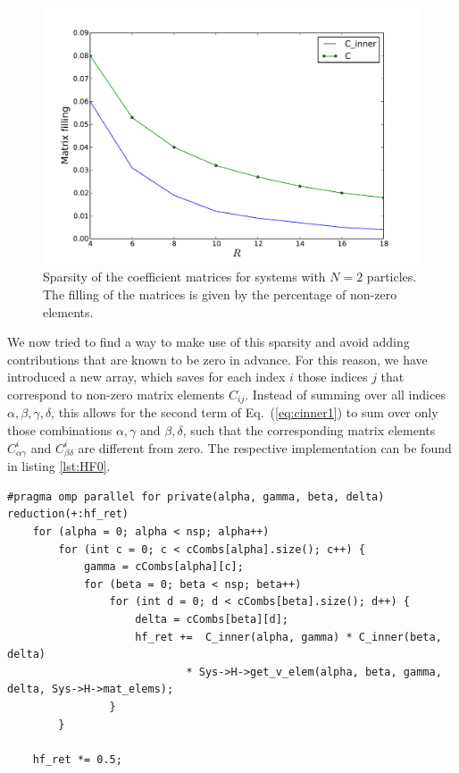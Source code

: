 \begin{figure}
\begin{center}
\includegraphics[scale=0.4]{../Plots/sparsity.pdf}
\caption{Sparsity of the coefficient matrices for systems with $N=2$ particles. The filling of the matrices is given by the percentage of non-zero elements.}
\label{fig:sparsity}
\end{center}
\end{figure}

We now tried to find a way to make use of this sparsity and avoid adding contributions that are known to be zero in advance. For this reason, we have introduced a new array, which saves for each index $i$ those indices $j$ that correspond to non-zero matrix elements $C_{ij}$. Instead of summing over all indices $\alpha,\beta,\gamma,\delta$, this allows for the second term of Eq.~(\ref{eq:cinner1}) to sum over only those combinations $\alpha,\gamma$ and $\beta,\delta$, such that the corresponding matrix elements $C_{\alpha\gamma}^i$ and  $C_{\beta\delta}^i$ are different from zero. The respective implementation can be found in listing \ref{lst:HF0}.

\begin{lstlisting}[float, caption={Calculation of the two-body contribution to the Hartree-Fock energy as given in Eq.~(\ref{eq:cinner1}). To minimize the number of terms, the array \textit{cCombs} contains those combinations of indices $p$ and $q$ such that the matrix elements $C_{pq}^i$ are different from zero. Parallelization is performed with OpenMP, where the clause \textit{reduction} ensures that all contributions are properly summed up.}, label={lst:HF0}]
#pragma omp parallel for private(alpha, gamma, beta, delta) reduction(+:hf_ret)
    for (alpha = 0; alpha < nsp; alpha++)
        for (int c = 0; c < cCombs[alpha].size(); c++) {
            gamma = cCombs[alpha][c];
            for (beta = 0; beta < nsp; beta++)
                for (int d = 0; d < cCombs[beta].size(); d++) {
                    delta = cCombs[beta][d];
                    hf_ret +=  C_inner(alpha, gamma) * C_inner(beta, delta)
                            * Sys->H->get_v_elem(alpha, beta, gamma, delta, Sys->H->mat_elems);
                }
        }
    
    hf_ret *= 0.5;
\end{lstlisting}




